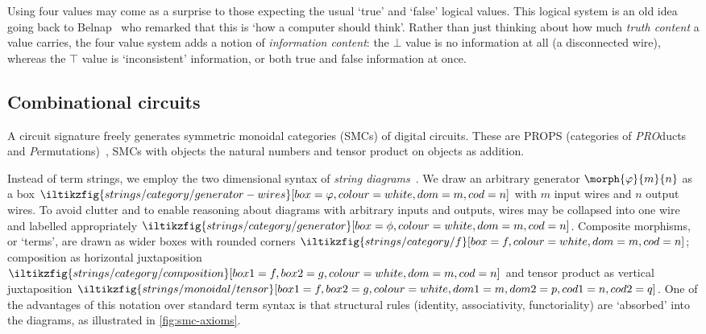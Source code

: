 \documentclass{lmcs}
\begin{document}
\begin{rem}
    Using four values may come as a surprise to those expecting the usual
    `true' and `false' logical values.
    This logical system is an old idea going back to
    Belnap~\cite{belnap1977useful} who remarked that this is `how a computer
    should think'.
    Rather than just thinking about how much \emph{truth content} a value
    carries, the four value system adds a notion of \emph{information content}:
    the \(\bot\) value is no information at all (a disconnected wire), whereas
    the \(\top\) value is `inconsistent' information, or both true and false
    information at once.
\end{rem}

\subsection{Combinational circuits}

A circuit signature freely generates symmetric monoidal categories (SMCs) of
digital circuits.
These are PROPS (categories of \emph{PRO}ducts and
\emph{P}ermutations)~\cite{maclane1965categorical}, SMCs with objects the
natural numbers and tensor product on objects as addition.

Instead of term strings, we employ the two dimensional syntax of
\emph{string diagrams}~\cite{joyal1991geometry,joyal1996traced,selinger2011survey}.
We draw an arbitrary generator \(\morph{\varphi}{m}{n}\) as a box \(
\iltikzfig{strings/category/generator-wires}[box=\varphi,colour=white,dom=m,cod=n]
\) with \(m\) input wires and \(n\) output wires.
To avoid clutter and to enable reasoning about diagrams with arbitrary
inputs and outputs, wires may be collapsed into one wire and labelled
appropriately \(
\iltikzfig{strings/category/generator}[box=\phi,colour=white,dom=m,cod=n]
\).
Composite morphisms, or `terms', are drawn as wider boxes with rounded corners
\(
\iltikzfig{strings/category/f}[box=f,colour=white,dom=m,cod=n]
\); composition as horizontal juxtaposition \(
\iltikzfig{strings/category/composition}[box1=f,box2=g,colour=white,dom=m,cod=n]
\) and tensor product as vertical juxtaposition \(
\iltikzfig{strings/monoidal/tensor}[box1=f,box2=g,colour=white,dom1=m,dom2=p,cod1=n,cod2=q]
\).
One of the advantages of this notation over standard term syntax is that
structural rules (identity, associativity, functoriality) are `absorbed' into
the diagrams, as illustrated in \cref{fig:smc-axioms}.
\end{document}
